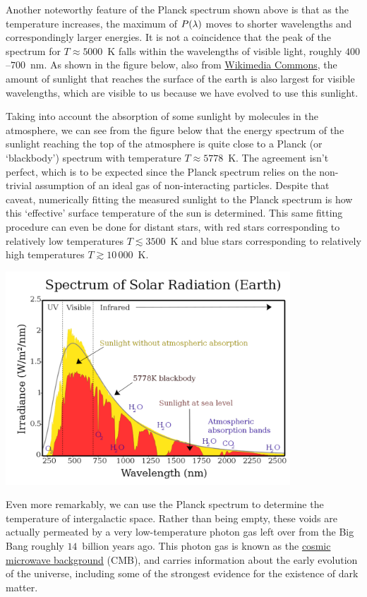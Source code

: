 Another noteworthy feature of the Planck spectrum shown above is that as the temperature increases, the maximum of $P(\lambda)$ moves to shorter wavelengths and correspondingly larger energies.
It is not a coincidence that the peak of the spectrum for $T \approx 5000$~K falls within the wavelengths of visible light, roughly $400$--$700$~nm.
As shown in the figure below, also from \href{https://commons.wikimedia.org/wiki/File:Solar_spectrum_en.svg}{Wikimedia Commons}, the amount of sunlight that reaches the surface of the earth is also largest for visible wavelengths, which are visible to us because we have evolved to use this sunlight.

Taking into account the absorption of some sunlight by molecules in the atmosphere, we can see from the figure below that the energy spectrum of the sunlight reaching the top of the atmosphere is quite close to a Planck (or `blackbody') spectrum with temperature $T \approx 5778$~K.
The agreement isn't perfect, which is to be expected since the Planck spectrum relies on the non-trivial assumption of an ideal gas of non-interacting particles.
Despite that caveat, numerically fitting the measured sunlight to the Planck spectrum is how this `effective' surface temperature of the sun is determined.
This same fitting procedure can even be done for distant stars, with red stars corresponding to relatively low temperatures $T \lesssim 3500$~K and blue stars corresponding to relatively high temperatures $T \gtrsim 10\,000$~K. \\[-24 pt]
\begin{center}\includegraphics[width=0.8\textwidth]{figs/unit08_sun.pdf}\end{center}

Even more remarkably, we can use the Planck spectrum to determine the temperature of intergalactic space.
Rather than being empty, these voids are actually permeated by a very low-temperature photon gas left over from the Big Bang roughly $14$~billion years ago.
This photon gas is known as the \href{https://en.wikipedia.org/wiki/Cosmic_microwave_background}{cosmic microwave background} (CMB), and carries information about the early evolution of the universe, including some of the strongest evidence for the existence of dark matter.

